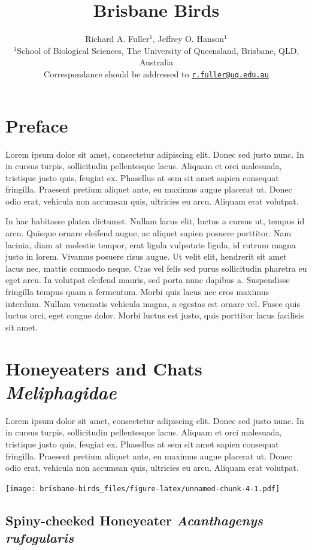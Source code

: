 \documentclass[]{book}
\title{Brisbane Birds}
\author{Richard A. Fuller\(^1\), Jeffrey O. Hanson\(^1\)\\
\(^1\)School of Biological Sciences, The University of Queensland,
Brisbane, QLD, Australia\\
Correspondance should be addressed to
\href{mailto:r.fuller@uq.edu.au}{\nolinkurl{r.fuller@uq.edu.au}}}
\date{}
\begin{document}
\maketitle

{
\setcounter{tocdepth}{1}
\tableofcontents
}
\chapter{Preface}\label{preface}

Lorem ipsum dolor sit amet, consectetur adipiscing elit. Donec sed justo
nunc. In in cursus turpis, sollicitudin pellentesque lacus. Aliquam et
orci malesuada, tristique justo quis, feugiat ex. Phasellus at sem sit
amet sapien consequat fringilla. Praesent pretium aliquet ante, eu
maximus augue placerat ut. Donec odio erat, vehicula non accumsan quis,
ultricies eu arcu. Aliquam erat volutpat.

In hac habitasse platea dictumst. Nullam lacus elit, luctus a cursus ut,
tempus id arcu. Quisque ornare eleifend augue, ac aliquet sapien posuere
porttitor. Nam lacinia, diam at molestie tempor, erat ligula vulputate
ligula, id rutrum magna justo in lorem. Vivamus posuere risus augue. Ut
velit elit, hendrerit sit amet lacus nec, mattis commodo neque. Cras vel
felis sed purus sollicitudin pharetra eu eget arcu. In volutpat eleifend
mauris, sed porta nunc dapibus a. Suspendisse fringilla tempus quam a
fermentum. Morbi quis lacus nec eros maximus interdum. Nullam venenatis
vehicula magna, a egestas est ornare vel. Fusce quis luctus orci, eget
congue dolor. Morbi luctus est justo, quis porttitor lacus facilisis sit
amet.

\chapter{\texorpdfstring{Honeyeaters and Chats
\emph{Meliphagidae}}{Honeyeaters and Chats Meliphagidae}}\label{honeyeaters-and-chats-meliphagidae}

Lorem ipsum dolor sit amet, consectetur adipiscing elit. Donec sed justo
nunc. In in cursus turpis, sollicitudin pellentesque lacus. Aliquam et
orci malesuada, tristique justo quis, feugiat ex. Phasellus at sem sit
amet sapien consequat fringilla. Praesent pretium aliquet ante, eu
maximus augue placerat ut. Donec odio erat, vehicula non accumsan quis,
ultricies eu arcu. Aliquam erat volutpat.

\texttt{[image: brisbane-birds\_files/figure-latex/unnamed-chunk-4-1.pdf]}

\section{\texorpdfstring{Spiny-cheeked Honeyeater \emph{Acanthagenys
rufogularis}}{Spiny-cheeked Honeyeater Acanthagenys rufogularis}}\label{spiny-cheeked-honeyeater-acanthagenys-rufogularis}
\end{document}
